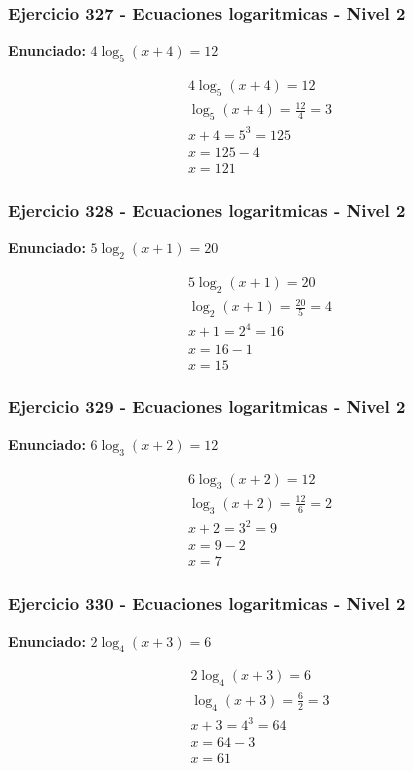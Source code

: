 \documentclass[12pt,a4paper]{article}
\begin{document}
\subsubsection*{Ejercicio 327 - Ecuaciones logaritmicas - Nivel 2}
\textbf{Enunciado:} \(4\log_{5}\left(x+4\right)=12\)

\[
\begin{aligned}
4\log_{5}\left(x+4\right)=12\\
\log_{5}\left(x+4\right)=\frac{12}{4}=3\\
x+4=5^{3}=125\\
x=125-4\\
\boxed{x=121}
\end{aligned}
\]


\subsubsection*{Ejercicio 328 - Ecuaciones logaritmicas - Nivel 2}
\textbf{Enunciado:} \(5\log_{2}\left(x+1\right)=20\)

\[
\begin{aligned}
5\log_{2}\left(x+1\right)=20\\
\log_{2}\left(x+1\right)=\frac{20}{5}=4\\
x+1=2^{4}=16\\
x=16-1\\
\boxed{x=15}
\end{aligned}
\]


\subsubsection*{Ejercicio 329 - Ecuaciones logaritmicas - Nivel 2}
\textbf{Enunciado:} \(6\log_{3}\left(x+2\right)=12\)

\[
\begin{aligned}
6\log_{3}\left(x+2\right)=12\\
\log_{3}\left(x+2\right)=\frac{12}{6}=2\\
x+2=3^{2}=9\\
x=9-2\\
\boxed{x=7}
\end{aligned}
\]


\subsubsection*{Ejercicio 330 - Ecuaciones logaritmicas - Nivel 2}
\textbf{Enunciado:} \(2\log_{4}\left(x+3\right)=6\)

\[
\begin{aligned}
2\log_{4}\left(x+3\right)=6\\
\log_{4}\left(x+3\right)=\frac{6}{2}=3\\
x+3=4^{3}=64\\
x=64-3\\
\boxed{x=61}
\end{aligned}
\]
\end{document}
